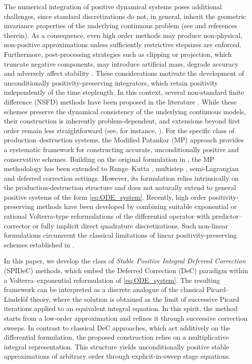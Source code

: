 \documentclass[a4paper,num-refs]{oup-contemporary-spidec}
\begin{document}
The numerical integration of positive dynamical systems poses additional challenges, since standard discretizations do not, in general, inherit the geometric invariance properties of the underlying continuous problem (see \cite{hairer2006geometric} and references therein). As a consequence, even high order methods may produce non-physical, non-positive approximations unless sufficiently restrictive stepsizes are enforced. Furthermore, post-processing strategies such as clipping or projection, which truncate negative components, may introduce artificial mass, degrade accuracy and adversely affect stability \cite{Blanes_2022,N_lein_2021}. These considerations motivate the development of unconditionally positivity-preserving integrators, which retain positivity independently of the time steplength. In this context, several non-standard finite difference (NSFD) methods have been proposed in the literature \cite{computation12090183,NSFD_Dajana,NSFD_JCD,NSFD_MBE,Mickens_2000}. While these schemes preserve the dynamical consistency of the underlying continuous models, their construction is inherently problem-dependent, and extensions beyond first order remain less straightforward (see, for instance, \cite{Arenas03062026,Hoang_2024,HOANG2026130029}). For the specific class of production–destruction systems, the Modified Patankar (MP) approach provides a systematic framework for constructing accurate,  unconditionally positive and conservative schemes. Building on the original formulation in \cite{BURCHARD20031}, the MP methodology has been extended to Runge–Kutta \cite{AVILA2021113350,Huang_2023,Izgin_2025}, multistep \cite{Izzo_2025}, semi-Lagrangian \cite{Cacace_2026} and deferred correction \cite{Torlo_Issues,Torlo_Offner} settings. However, its formulation relies intrinsically on the production-destruction structure and does not naturally extend to general positive systems of the form \eqref{eq:ODE_system}. Recently, high order positivity-preserving methods have been developed by combining suitable exponential or rational Volterra-type reformulations of the differential operator with predictor–corrector \cite{CdS,Replicator_Pezzella} or fully implicit direct quadrature \cite{Mixing,Axioms,Pezzella_ESAIM} discretizations. Such non-linear formulations circumvent the classical limitations of linear positivity-preserving schemes established in \cite{Bolley_1978}.

In this paper, we develop the class of \emph{Stable Positive Integral Deferred Correction} (SPIDeC) methods, which embed the Deferred Correction (DeC) paradigm \cite{Abgrall_2017, Dutt_2000, Ong_2020} within a Volterra–exponential reformulation of \eqref{eq:ODE_system}. The resulting framework can be interpreted as a discrete analogue of the classical Picard–Lindelöf theory, where the solution is obtained as the limit of successive Picard iterations applied to an equivalent integral equation. In this spirit, the method starts from a low-order approximation and refines it through successive correction sweeps. In contrast to classical DeC approaches, which act additively on the differential formulation, the proposed construction relies on a multiplicative integral representation. This structure yields unconditionally positive stable approximations of arbitrary order through explicit-in-sweep stage equations.
\end{document}
